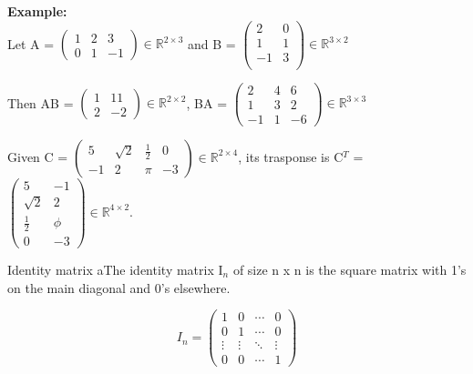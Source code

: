 \noindent
\textbf{Example:}\\
Let A = $\begin{pmatrix}
    1 & 2 & 3 \\
    0 & 1 & -1
\end{pmatrix} \in \mathbb{R}^{2 \times 3}$ 
and B = $\begin{pmatrix}
    2 & 0 \\ 
    1 & 1 \\ 
    -1 & 3 \\ 
\end{pmatrix} \in \mathbb{R}^{3 \times 2}$
\medskip

\noindent
Then AB = $\begin{pmatrix} 
    1 & 11 \\
    2 & -2
\end{pmatrix} \in \mathbb{R}^{2 \times 2}$, 
BA = $\begin{pmatrix}
    2 & 4 & 6 \\
    1 & 3 & 2 \\
    -1 & 1 & -6 
\end{pmatrix} \in \mathbb{R}^{3 \times 3}$ 
\bigskip

\noindent
Given C = $\begin{pmatrix}
    5 & \sqrt{2} & \frac{1}{2} & 0\\
    -1 & 2 & \pi & -3
\end{pmatrix} \in \mathbb{R}^{2 \times 4}$, its trasponse is 
C$^T$ = $\begin{pmatrix}
    5 & -1 \\ 
    \sqrt{2} & 2 \\ 
    \frac{1}{2} & \phi \\ 
    0 & -3
\end{pmatrix} \in \mathbb{R}^{4 \times 2}$.

\begin{defBox}{Identity matrix}
    aThe identity matrix I$_n$ of size n x n is the square matrix with 1's on the main diagonal and 0's elsewhere.
     \begin{center}
        \[
        I_n =
        \begin{pmatrix}
        1 & 0 & \cdots & 0 \\
        0 & 1 & \cdots & 0 \\
        \vdots & \vdots & \ddots & \vdots \\
        0 & 0 & \cdots & 1
        \end{pmatrix}
        \]
    \end{center}
\end{defBox}

